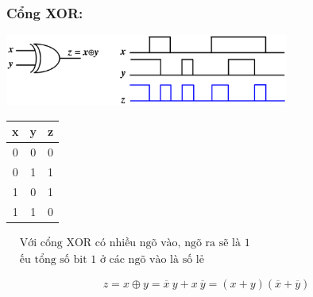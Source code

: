 \subsubsection{Cổng XOR:}
\begin{center}
    \includegraphics[width = 0.7\textwidth]{./local/image/25.png}
\end{center}
\begin{table}[h!]
    \centering
    \begin{tabular}{|cc|c|}
    \hline
    \textbf{x} & \textbf{y} & \textbf{z} \\ \hline
    0          & 0          & 0                      \\ 
    0          & 1          & 1                      \\ 
    1          & 0          & 1                      \\ 
    1          & 1          & 0                      \\ \hline
    \end{tabular} \qquad 
    $\begin{aligned}
        &\text{Với cổng XOR có nhiều ngõ vào, ngõ ra sẽ là 1}\\
        &\text{ếu tổng số bit 1 ở các ngõ vào là số lẻ}
    \end{aligned}$
\end{table}
\[
    z = x \oplus y = \overline{x}\ y + x\ \overline{y} = (x+y)(\overline{x} + \overline{y})
\]

